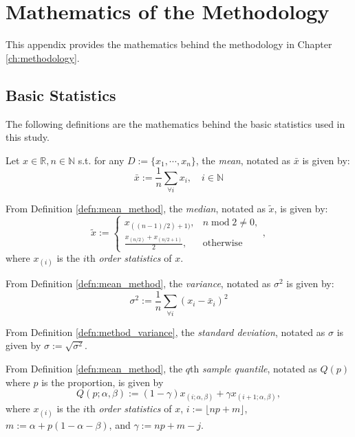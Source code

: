 \chapter{Mathematics of the Methodology}\label{app:math_methodology}
This appendix provides the mathematics behind the methodology in Chapter \ref{ch:methodology}. 

\section{Basic Statistics}
The following definitions are the mathematics behind the basic statistics used in this study.

\begin{defn}[Mean]\label{defn:mean_method}
    Let $x\in\mathbb{R}, n\in\mathbb{N}$ s.t. for any $D:=\{x_1,\cdots,x_n\}$, the \textit{mean}, notated as $\bar{x}$ is given by:
    \begin{equation}
        \bar{x}:=\frac{1}{n}\sum_{\forall i}x_i,\quad i\in\mathbb{N}
    \end{equation}
\end{defn}
\begin{defn}[Median]
    From Definition \ref{defn:mean_method}, the \textit{median}, notated as $\tilde{x}$, is given by:
    \begin{equation}
        \tilde{x}:=\begin{cases}
            x_{((n-1)/2)+1)},& n\operatorname{mod}2 \neq 0,\\[0.3cm]
            \displaystyle\frac{x_{(n/2)}+x_{(n/2+1)}}{2},&\text{otherwise}
        \end{cases},
    \end{equation}  
    where $x_{(i)}$ is the $i$th \textit{order statistics} of $x$.
\end{defn}
\begin{defn}[Variance]\label{defn:method_variance}
    From Definition \ref{defn:mean_method}, the \textit{variance}, notated as $\sigma^2$ is given by:
    \begin{equation}
        \sigma^2:=\frac{1}{n}\sum_{\forall i}(x_i-\bar{x}_i)^2
    \end{equation}
\end{defn}
\begin{defn}
    From Definition \ref{defn:method_variance}, the \textit{standard deviation}, notated as $\sigma$ is given by $\sigma:=\sqrt{\sigma^2}$.
\end{defn}
\begin{defn}
    From Definition \ref{defn:mean_method}, the $q$th \textit{sample quantile}, notated as $Q(p)$ where $p$ is the proportion, is given by
    \begin{equation}
        Q(p;\alpha,\beta):=(1-\gamma)x_{(i;\alpha,\beta)} + \gamma x_{(i+1;\alpha,\beta)},
    \end{equation}
    where $x_{(i)}$ is the $i$th \textit{order statistics} of $x$, $i:=\lfloor np+m\rfloor$, $m:=\alpha+p(1-\alpha-\beta)$, and $\gamma:=np+m-j$.
\end{defn}
